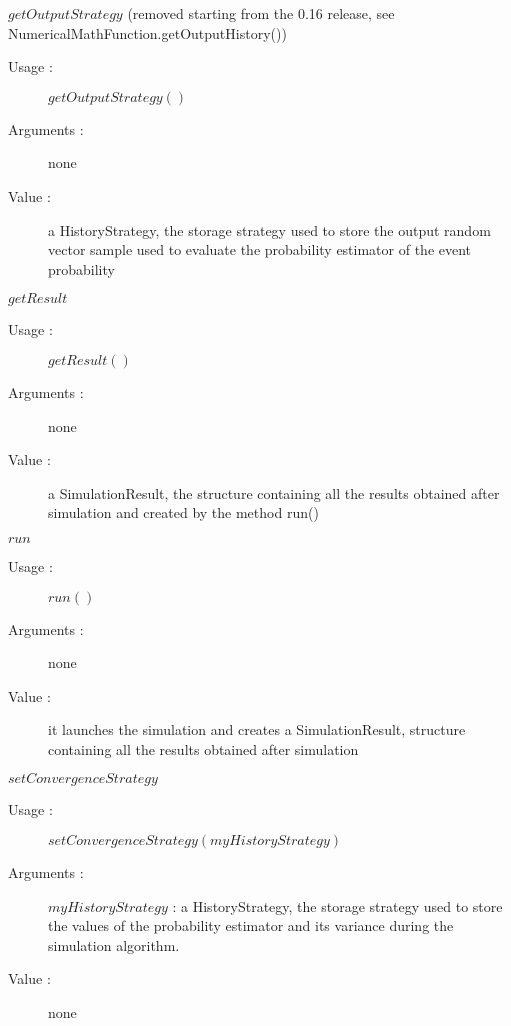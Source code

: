 \begin{description}
\begin{description}
  \item $getOutputStrategy$ (removed starting from the 0.16 release, see NumericalMathFunction.getOutputHistory())
    \begin{description}
    \item[Usage :] $getOutputStrategy()$
    \item[Arguments :] none
    \item[Value :]  a HistoryStrategy, the storage strategy used to store the output random vector sample used to evaluate the probability estimator of the event probability
    \end{description}
    \bigskip

  \item $getResult$
    \begin{description}
    \item[Usage :] $getResult()$
    \item[Arguments :] none
    \item[Value :]  a SimulationResult, the structure containing all the results obtained after simulation and created by the method run()
    \end{description}
    \bigskip

  \item $run$
    \begin{description}
    \item[Usage :] $run()$
    \item[Arguments :] none
    \item[Value :]  it launches the simulation and creates a SimulationResult, structure containing all the results obtained after simulation
    \end{description}
    \bigskip

  \item $setConvergenceStrategy$
    \begin{description}
    \item[Usage :] $setConvergenceStrategy(myHistoryStrategy)$
    \item[Arguments :] $myHistoryStrategy$ : a HistoryStrategy, the storage strategy used to store the values of the probability estimator and its variance during the simulation algorithm.
    \item[Value :]  none
    \end{description}
    \bigskip
 

\end{description}
\end{description}
